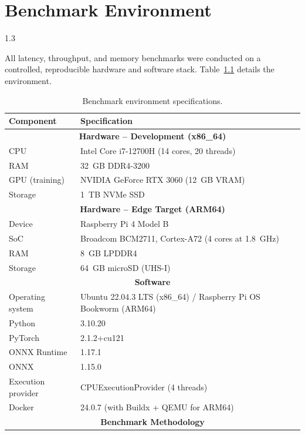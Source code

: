 
\chapter{Benchmark Environment}
\begin{spacing}{1.3}

All latency, throughput, and memory benchmarks were conducted on a controlled, reproducible hardware and software stack. Table~\ref{tab:bench_env} details the environment.

\begin{table}[H]
\centering
\caption{Benchmark environment specifications.}
\label{tab:bench_env}
\begin{tabular}{ll}
\toprule
\textbf{Component} & \textbf{Specification} \\
\midrule
\multicolumn{2}{c}{\textbf{Hardware -- Development (x86\_64)}} \\
\midrule
CPU                     & Intel Core i7-12700H (14 cores, 20 threads) \\
RAM                     & 32~GB DDR4-3200 \\
GPU (training)          & NVIDIA GeForce RTX 3060 (12~GB VRAM) \\
Storage                 & 1~TB NVMe SSD \\
\midrule
\multicolumn{2}{c}{\textbf{Hardware -- Edge Target (ARM64)}} \\
\midrule
Device                  & Raspberry Pi 4 Model B \\
SoC                     & Broadcom BCM2711, Cortex-A72 (4 cores at 1.8~GHz) \\
RAM                     & 8~GB LPDDR4 \\
Storage                 & 64~GB microSD (UHS-I) \\
\midrule
\multicolumn{2}{c}{\textbf{Software}} \\
\midrule
Operating system        & Ubuntu 22.04.3 LTS (x86\_64) / Raspberry Pi OS Bookworm (ARM64) \\
Python                  & 3.10.20 \\
PyTorch                 & 2.1.2+cu121 \\
ONNX Runtime            & 1.17.1 \\
ONNX                    & 1.15.0 \\
Execution provider      & CPUExecutionProvider (4 threads) \\
Docker                  & 24.0.7 (with Buildx + QEMU for ARM64) \\
\midrule
\multicolumn{2}{c}{\textbf{Benchmark Methodology}} \\

\end{tabular}
\end{table}
\end{spacing}
